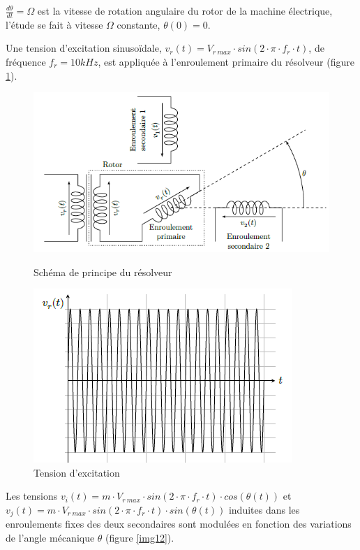 $\frac{d\theta}{dt}=\Omega$ est la vitesse de rotation angulaire du rotor de la machine électrique, l’étude se fait à vitesse $\Omega$ constante, $\theta(0) = 0$.

Une tension d’excitation sinusoïdale, $v_r(t)=V_{r\  max}\cdot sin(2\cdot \pi\cdot f_r\cdot t)$, de fréquence $f_r=10kHz$, est appliquée à
l’enroulement primaire du résolveur (figure \ref{img11}).

\begin{figure}[!h]
\begin{minipage}{0.5\linewidth}
\centering\includegraphics[width=0.9\linewidth]{img/fig10}
 \caption{Schéma de principe du résolveur}
 \label{img10}
\end{minipage}\hfill
\begin{minipage}{0.4\linewidth}
\centering\includegraphics[width=0.9\linewidth]{img/fig11}
 \caption{Tension d’excitation}
 \label{img11}
\end{minipage}
\end{figure}

Les tensions $v_i(t)=m\cdot V_{r\ max}\cdot sin(2\cdot \pi\cdot f_r\cdot t)\cdot cos(\theta(t))$ et $v_j(t)=m\cdot V_{r\ max}\cdot sin(2\cdot \pi\cdot f_r\cdot t)\cdot sin(\theta(t))$ induites dans les enroulements fixes des deux secondaires sont modulées en fonction des variations de l’angle mécanique $\theta$ (figure \ref{img12}).

